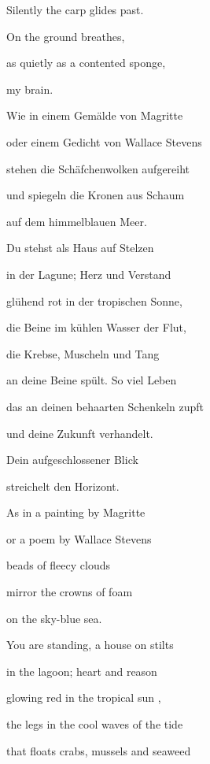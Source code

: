 \bigskip

Silently the carp glides past.

On the ground breathes, 

as quietly as a contented sponge, 

my brain.



\bigskip


\bigskip

Wie in einem Gemälde von Magritte

oder einem Gedicht von Wallace Stevens

stehen die Schäfchenwolken aufgereiht

und spiegeln die Kronen aus Schaum

auf dem himmelblauen Meer.


\bigskip

Du stehst als Haus auf Stelzen

in der Lagune; Herz und Verstand

glühend rot in der tropischen Sonne,

die Beine im kühlen Wasser der Flut,

die Krebse, Muscheln und Tang 


\bigskip

an deine Beine spült. So viel Leben

das an deinen behaarten Schenkeln zupft 

und deine Zukunft verhandelt. 

Dein aufgeschlossener Blick 

streichelt den Horizont.



\bigskip

As in a painting by Magritte

or a poem by Wallace Stevens

beads of fleecy clouds 

mirror the crowns of foam

on the sky-blue sea.


\bigskip

You are standing, a house on stilts

in the lagoon; heart and reason

glowing red in the tropical sun ,

the legs in the cool waves of the tide

that floats crabs, mussels and seaweed


